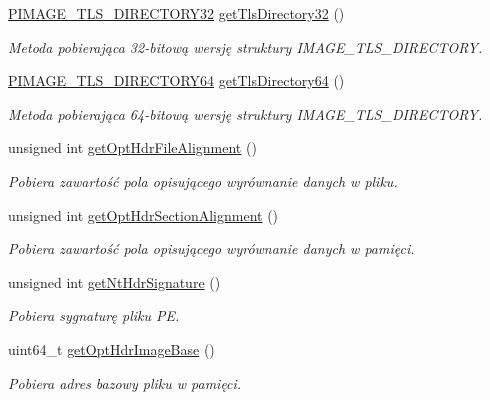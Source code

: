 \begin{DoxyCompactItemize}
\hyperlink{winheader_8h_a0fdb1e3e0c8bfc33cad7c169148b5906}{P\-I\-M\-A\-G\-E\-\_\-\-T\-L\-S\-\_\-\-D\-I\-R\-E\-C\-T\-O\-R\-Y32} \hyperlink{class_p_e_file_abe408c5a83eef65d6f1f7659fc2dd8d2}{get\-Tls\-Directory32} ()
\begin{DoxyCompactList}\small\item\em Metoda pobierająca 32-\/bitową wersję struktury I\-M\-A\-G\-E\-\_\-\-T\-L\-S\-\_\-\-D\-I\-R\-E\-C\-T\-O\-R\-Y. \end{DoxyCompactList}\item 
\hyperlink{winheader_8h_a18d0683249747b9c8290194976089ffb}{P\-I\-M\-A\-G\-E\-\_\-\-T\-L\-S\-\_\-\-D\-I\-R\-E\-C\-T\-O\-R\-Y64} \hyperlink{class_p_e_file_a1341deeaa1ad21de371dc474751167d2}{get\-Tls\-Directory64} ()
\begin{DoxyCompactList}\small\item\em Metoda pobierająca 64-\/bitową wersję struktury I\-M\-A\-G\-E\-\_\-\-T\-L\-S\-\_\-\-D\-I\-R\-E\-C\-T\-O\-R\-Y. \end{DoxyCompactList}\item 
unsigned int \hyperlink{class_p_e_file_a1f1c615e94907f34d9536c3f7a446589}{get\-Opt\-Hdr\-File\-Alignment} ()
\begin{DoxyCompactList}\small\item\em Pobiera zawartość pola opisującego wyrównanie danych w pliku. \end{DoxyCompactList}\item 
unsigned int \hyperlink{class_p_e_file_ad3099b5323833b3d3039f483b7f454ff}{get\-Opt\-Hdr\-Section\-Alignment} ()
\begin{DoxyCompactList}\small\item\em Pobiera zawartość pola opisującego wyrównanie danych w pamięci. \end{DoxyCompactList}\item 
unsigned int \hyperlink{class_p_e_file_a08145038525bdbd95f125e055286149f}{get\-Nt\-Hdr\-Signature} ()
\begin{DoxyCompactList}\small\item\em Pobiera sygnaturę pliku P\-E. \end{DoxyCompactList}\item 
uint64\-\_\-t \hyperlink{class_p_e_file_aba5f21e866470adc21d621994bdf9c8a}{get\-Opt\-Hdr\-Image\-Base} ()
\begin{DoxyCompactList}\small\item\em Pobiera adres bazowy pliku w pamięci. \end{DoxyCompactList}\item 

\end{DoxyCompactItemize}
